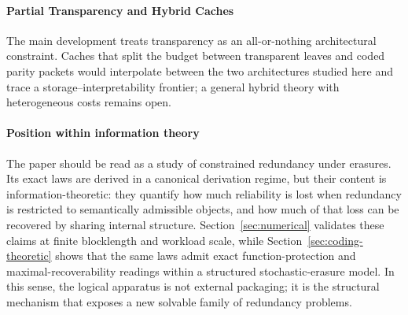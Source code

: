 \documentclass[journal]{IEEEtran}
\numberwithin{equation}{section}
\begin{document}
\paragraph{Partial Transparency and Hybrid Caches}
\label{para:discussion-partial}
The main development treats transparency as an all-or-nothing architectural
constraint.  Caches that split the budget between transparent leaves and
coded parity packets would interpolate between the two architectures
studied here and trace a storage--interpretability frontier; a general
hybrid theory with heterogeneous costs remains open.

\paragraph{Position within information theory}
The paper should be read as a study of constrained redundancy under
erasures.  Its exact laws are derived in a canonical derivation regime, but
their content is information-theoretic: they quantify how much reliability
is lost when redundancy is restricted to semantically admissible objects,
and how much of that loss can be recovered by sharing internal structure.
Section~\ref{sec:numerical} validates these claims at finite blocklength
and workload scale, while Section~\ref{sec:coding-theoretic} shows that
the same laws admit exact function-protection and
maximal-recoverability readings within a structured stochastic-erasure
model.  In this sense, the logical apparatus is not external packaging; it
is the structural mechanism that exposes a new solvable family of
redundancy problems.
\end{document}
